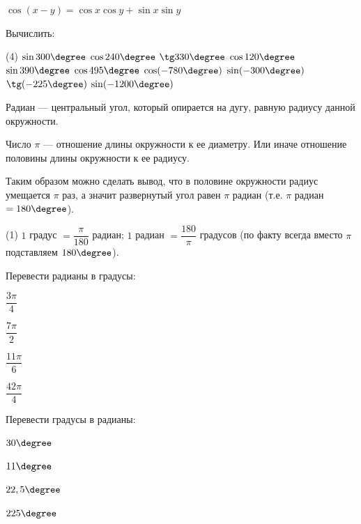 \begin{class}[number=7]
\begin{listofex}
\begin{tasks}
			\task \( \cos(x-y)=\cos x \cos y + \sin x \sin y \)
		\end{tasks}
	\item Вычислить:
	\begin{tasks}(4)
		\task \( \sin 300\degree \)
		\task \( \cos 240\degree \)
		\task \( \tg 330\degree \)
		\task \( \cos 120\degree \)
		\task \( \sin 390\degree \)
		\task \( \cos 495\degree \)
		\task \( \cos (-780\degree) \)
		\task \( \sin (-300\degree) \)
		\task \( \tg (-225\degree) \)
		\task \( \sin (-1200\degree) \)
	\end{tasks}
	\end{listofex}
		\begin{definit}
		Радиан --- центральный угол, который опирается на дугу, равную радиусу данной окружности.
		\end{definit}
		\begin{definit}
		Число \( \pi \) --- отношение длины окружности к ее диаметру. Или иначе отношение половины длины окружности к ее радиусу.
		\end{definit}
		Таким образом можно сделать вывод, что в половине окружности радиус умещается \( \pi \) раз, а значит развернутый угол равен \( \pi \) радиан (т.е. \( \pi \) радиан \( = 180\degree \)).
		\begin{tasks}(1)
		\task \( 1 \) градус \( = \dfrac{\pi}{180} \) радиан;
		\task \( 1 \) радиан \( = \dfrac{180}{\pi}\) градусов (по факту всегда вместо \( \pi \) подставляем \( 180\degree \)).
		\end{tasks}
		\begin{listofex}[resume]
			\item Перевести радианы в градусы:
			\begin{enumcols}[itemcolumns=4]
				\item \( \dfrac{3\pi}{4} \)
				\item \( \dfrac{7\pi}{2} \)
				\item \( \dfrac{11\pi}{6} \)
				\item \( \dfrac{42\pi}{4} \)
			\end{enumcols}
			\item Перевести градусы в радианы:
			\begin{enumcols}[itemcolumns=4]
				\item \( 30\degree \)
				\item \( 11\degree \)
				\item \( 22,5\degree \)
				\item \( 225\degree \)
			\end{enumcols}
\end{listofex}
\end{class}

